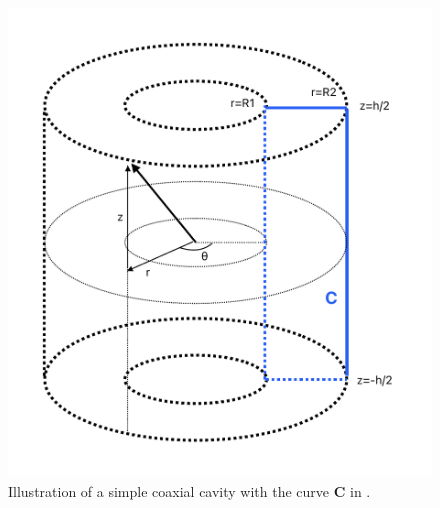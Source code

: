 \documentclass[a4paper,oneside,12pt]{report}
\numberwithin{equation}{chapter}
\begin{document}
\begin{figure}[H]
    \centering
    \includegraphics[width=.55\textwidth]{./figures/illustrations/rhodo_integral_curve.pdf}
    \vspace{20pt}
    \caption{Illustration of a simple coaxial cavity with the curve \textbf{C} in .}
    \label{fig:int_curve}
\end{figure}
\end{document}
